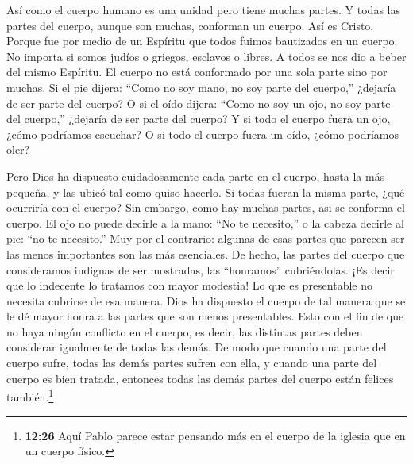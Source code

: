  Así como el cuerpo humano es una unidad pero tiene muchas
partes. Y todas las partes del cuerpo, aunque son muchas, conforman un
cuerpo. Así es Cristo.  Porque fue por medio de un Espíritu
que todos fuimos bautizados en un cuerpo. No importa si somos judíos o
griegos, esclavos o libres. A todos se nos dio a beber del mismo
Espíritu.  El cuerpo no está conformado por una sola parte
sino por muchas.  Si el pie dijera: ``Como no soy mano, no
soy parte del cuerpo,'' ¿dejaría de ser parte del cuerpo? 
O si el oído dijera: ``Como no soy un ojo, no soy parte del cuerpo,''
¿dejaría de ser parte del cuerpo?  Y si todo el cuerpo
fuera un ojo, ¿cómo podríamos escuchar? O si todo el cuerpo fuera un
oído, ¿cómo podríamos oler?

 Pero Dios ha dispuesto cuidadosamente cada parte en el
cuerpo, hasta la más pequeña, y las ubicó tal como quiso hacerlo.
 Si todas fueran la misma parte, ¿qué ocurriría con el
cuerpo?  Sin embargo, como hay muchas partes, asi se
conforma el cuerpo.  El ojo no puede decirle a la mano:
``No te necesito,'' o la cabeza decirle al pie: ``no te necesito.''
 Muy por el contrario: algunas de esas partes que parecen
ser las menos importantes son las más esenciales.  De
hecho, las partes del cuerpo que consideramos indignas de ser mostradas,
las ``honramos'' cubriéndolas. ¡Es decir que lo indecente lo tratamos
con mayor modestia!  Lo que es presentable no necesita
cubrirse de esa manera. Dios ha dispuesto el cuerpo de tal manera que se
le dé mayor honra a las partes que son menos presentables. 
Esto con el fin de que no haya ningún conflicto en el cuerpo, es decir,
las distintas partes deben considerar igualmente de todas las demás.
 De modo que cuando una parte del cuerpo sufre, todas las
demás partes sufren con ella, y cuando una parte del cuerpo es bien
tratada, entonces todas las demás partes del cuerpo están felices
también.\footnote{\textbf{12:26} Aquí Pablo parece estar pensando más en
  el cuerpo de la iglesia que en un cuerpo físico.}


